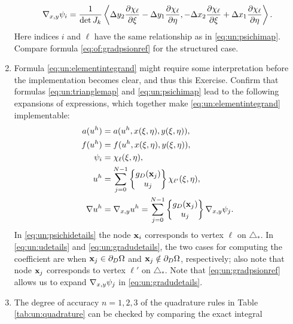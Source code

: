\begin{enumerate}
\begin{equation}
\nabla_{x,y} \psi_i = \frac{1}{\det J_k} \left<\Delta y_2 \frac{\partial \chi_\ell}{\partial \xi} - \Delta y_1 \frac{\partial \chi_\ell}{\partial \eta}, - \Delta x_2 \frac{\partial \chi_\ell}{\partial \xi} + \Delta x_1 \frac{\partial \chi_\ell}{\partial \eta}\right>. \label{eq:un:gradpsionref}
\end{equation}
Here indices $i$ and $\ell$ have the same relationship as in \eqref{eq:un:psichimap}.  Compare formula \eqref{eq:of:gradpsionref} for the structured case.
\item  \label{exer:un:elementintegranddetails}  Formula \eqref{eq:un:elementintegrand} might require some interpretation before the implementation becomes clear, and thus this Exercise.  Confirm that formulas \eqref{eq:un:trianglemap} and \eqref{eq:un:psichimap} lead to the following expansions of expressions, which together make \eqref{eq:un:elementintegrand} implementable:
\begin{align}
a(u^h) &= a(u^h,x(\xi,\eta),y(\xi,\eta)), \label{eq:un:adetails} \\
f(u^h) &= f(u^h,x(\xi,\eta),y(\xi,\eta)), \label{eq:un:fdetails} \\
\psi_i &= \chi_{\ell}(\xi,\eta), \label{eq:un:psichidetails} \\
u^h &= \sum_{j=0}^{N-1} \left\{\begin{matrix} g_D(\mathbf{x}_j) \\ u_j \end{matrix}\right\} \chi_{\ell'}(\xi,\eta), \label{eq:un:udetails} \\
\nabla u^h &= \nabla_{x,y} u^h = \sum_{j=0}^{N-1} \left\{\begin{matrix} g_D(\mathbf{x}_j) \\ u_j \end{matrix}\right\} \nabla_{x,y} \psi_j. \label{eq:un:gradudetails}
\end{align}
In \eqref{eq:un:psichidetails} the node $\mathbf{x}_i$ corresponds to vertex $\ell$ on $\triangle_\ast$.  In \eqref{eq:un:udetails} and \eqref{eq:un:gradudetails}, the two cases for computing the coefficient are when $\mathbf{x}_j \in \partial_D \Omega$ and $\mathbf{x}_j \notin \partial_D \Omega$, respectively; also note that node $\mathbf{x}_j$ corresponds to vertex $\ell'$ on $\triangle_\ast$.  Note that \eqref{eq:un:gradpsionref} allows us to expand $\nabla_{x,y} \psi_j$ in \eqref{eq:un:gradudetails}.
\item  \label{exer:un:checkquadrature}  The degree of accuracy $n=1,2,3$ of the quadrature rules in Table \ref{tab:un:quadrature} can be checked by comparing the exact integral

\end{enumerate}
